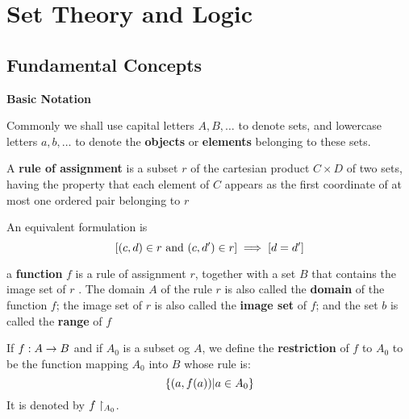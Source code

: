 \section{Set Theory and Logic}

\subsection{Fundamental Concepts}

\textbf{Basic Notation}

Commonly we shall use capital letters $ A,B, \ldots $ to denote sets, and lowercase letters $ a,b, \ldots $ to denote the \textbf{objects} or \textbf{elements} belonging to these sets.



\begin{defn}
	A \textbf{rule of assignment} is a subset $r$ of the cartesian product $C \times D$ of two sets, having the property that each element of $C$ appears as the first coordinate of at most one ordered pair belonging to $r$
\end{defn}
An equivalent formulation is
\[ [ (c,d) \in r \textrm{ and } (c,d') \in r ] \implies [d = d'] \]

\begin{defn}
	a \textbf{function } $f$ is a rule of assignment $r$, together with a set $B$ that contains the image set of $r$ . The domain $A$ of the rule $r$ is also called the \textbf{domain} of the function $f$; the image set of $r$ is also called the \textbf{image set} of $f$; and the set $b$ is called the \textbf{range} of $f$
\end{defn}

\begin{defn}
	If $f : A \rightarrow B$ and if $A_0$ is a subset og $A$, we define the \textbf{restriction} of $f$ to $A_0$ to be the function mapping $A_0$ into $ B $ whose rule is:
	\[ \left\lbrace (a,f(a)) | a \in A_0 \right\rbrace \]
	It is denoted by $ f\restriction_{A_0} $.
\end{defn}

